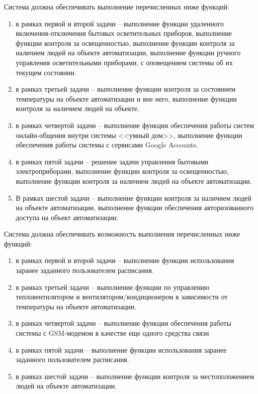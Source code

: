 \documentclass[a4paper, 12pt, titlepage]{article}
\begin{document}
Система должна обеспечивать выполнение перечисленных ниже функций:
\begin{enumerate}
\item в рамках первой и второй задачи -- выполнение функции удаленного включения-отключения бытовых осветительных приборов, 
выполнение функции контроля за 
освещенностью, выполнение функции контроля за наличием людей на объекте автоматизации, выполнение функции ручного управления 
осветительными приборами, с оповещением системы об их текущем состоянии.
\item в рамках третьей задачи -- выполнение функции контроля за состоянием температуры на объекте автоматизации и вне него, 
выполнение функции контроля за наличием людей на объекте.
\item в рамках четвертой задачи -- выполнение функции обеспечения работы систем онлайн-общения внутри системы <<умный дом>>, 
выполнение функции обеспечения работы системы с сервисами Google Accounts.
\item в рамках пятой задачи -- решение задачи управления бытовыми электроприборами, выполнение функции контроля за 
освещенностью, выполнение функции контроля за наличием людей на объекте автоматизации.
\item В рамках шестой задачи -- выполнение функции контроля за наличием людей на объекте автоматизации, выполнение функции 
обеспечения авторизованного доступа на объект автоматизации.
\end{enumerate}

Система должна обеспечивать возможность выполнения перечисленных ниже функций:
\begin{enumerate}
\item в рамках первой и второй задачи -- выполнение функции использования заранее заданного пользователем расписания.
\item в рамках третьей задачи -- выполнение функции по управлению тепловентилятором и вентилятором/кондиционером в зависимости 
от температуры на объекте автоматизации.
\item в рамках четвертой задачи -- выполнение функции обеспечения работы системы с 
GSM-модемом в качестве еще одного средства связи
\item в рамках пятой задачи -- выполнение функции использования заранее заданного пользователем расписания.
\item в рамках шестой задачи -- выполнение функции контроля за местоположением людей на объекте автоматизации.
\end{enumerate}
\end{document}

